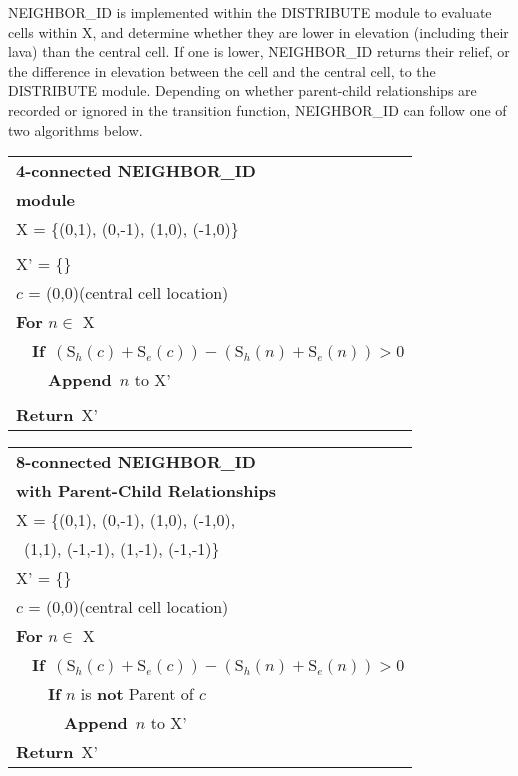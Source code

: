 		NEIGHBOR\_ID is implemented within the DISTRIBUTE module to evaluate cells within X, and determine whether they are lower in elevation (including their lava) than the central cell. If one is lower, NEIGHBOR\_ID returns their relief, or the difference in elevation between the cell and the central cell, to the DISTRIBUTE module. Depending on whether parent-child relationships are recorded or ignored in the transition function, NEIGHBOR\_ID can follow one of two algorithms below.
		\begin{center}
		\begin{tabular}{l}
			\toprule
			\textbf{4-connected NEIGHBOR\_ID}\\
			\textbf{module}\\
			\midrule
			X = \{(0,1), (0,-1), (1,0), (-1,0)\}\\\\
			X' = \{\}\\
			$c$ = (0,0)\qquad (central cell location)\\
			\textbf{For} $n\in$ X\\
			~~\textbf{If}~$(\text{S}_h(c)+\text{S}_e(c))-(\text{S}_h(n)+\text{S}_e(n)) > 0$\\
			~~~~\textbf{Append}~$n$ to X'\\\\
			\textbf{Return}~X'\\
			\bottomrule
		\end{tabular}
		\begin{tabular}{l}
			\toprule
			\textbf{8-connected NEIGHBOR\_ID}\\
			\textbf{with Parent-Child Relationships}\\
			\midrule
			X = \{(0,1), (0,-1), (1,0), (-1,0), \\
			\qquad~(1,1), (-1,-1), (1,-1), (-1,-1)\}\\
			X' = \{\}\\
			$c$ = (0,0)\qquad (central cell location)\\
			\textbf{For} $n\in$ X\\
			~~\textbf{If}~$(\text{S}_h(c)+\text{S}_e(c))-(\text{S}_h(n)+\text{S}_e(n)) > 0$\\
			~~~~\textbf{If} $n$ is \textbf{not} Parent of $c$\\
			~~~~~~\textbf{Append}~$n$ to X'\\
			\textbf{Return}~X'\\
			\bottomrule
		\end{tabular}
		\end{center}



